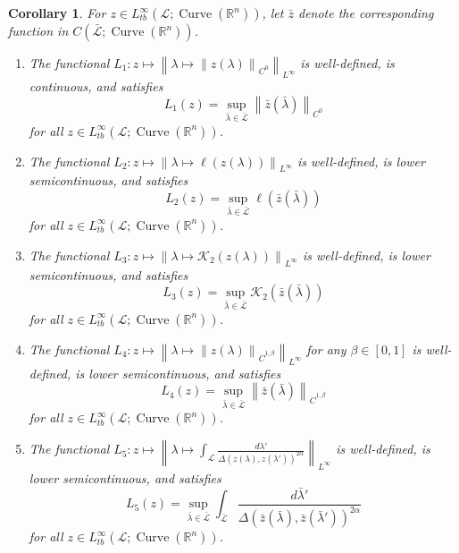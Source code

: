 \documentclass[reqno,centertags,12pt]{amsart}
\newtheorem{corollary}[theorem]{Corollary}
\theoremstyle{definition}
\numberwithin{equation}{section}
\newcommand{\norm}[1]{\left\|#1\right\|}
\newcommand{\bbR}{{\mathbb{R}}}
\begin{document}
\begin{corollary}\label{CC.8}
    For $z\in L_{tb}^{\infty}(\mathcal{L};\operatorname{Curve}(\bbR^{n}))$,
    let $\bar{z}$ denote the corresponding function in
    $C(\bar{\mathcal{L}};\operatorname{Curve}(\bbR^{n}))$.
    \begin{enumerate}
        \item The functional $L_{1}\colon z\mapsto
        \norm{\lambda\mapsto\norm{z(\lambda)}_{C^{0}}}_{L^{\infty}}$
        is well-defined, is continuous, and satisfies
        \[
            L_{1}(z) = \sup_{\bar{\lambda}\in\bar{\mathcal{L}}}
            \norm{\bar{z}(\bar{\lambda})}_{C^{0}}
        \]
        for all $z\in L_{tb}^{\infty}(\mathcal{L};\operatorname{Curve}(\bbR^{n}))$.

        \item The functional $L_{2}\colon z\mapsto
        \norm{\lambda\mapsto\ell(z(\lambda))}_{L^{\infty}}$
        is well-defined, is lower semicontinuous, and satisfies
        \[
            L_{2}(z) = \sup_{\bar{\lambda}\in\bar{\mathcal{L}}}
            \ell(\bar{z}(\bar{\lambda}))
        \]
        for all $z\in L_{tb}^{\infty}(\mathcal{L};\operatorname{Curve}(\bbR^{n}))$.

        \item The functional $L_{3}\colon z\mapsto
        \norm{\lambda\mapsto\mathcal{K}_{2}(z(\lambda))}_{L^{\infty}}$
        is well-defined, is lower semicontinuous, and satisfies
        \[
            L_{3}(z) = \sup_{\bar{\lambda}\in\bar{\mathcal{L}}}
            \mathcal{K}_{2}(\bar{z}(\bar{\lambda}))
        \]
        for all $z\in L_{tb}^{\infty}(\mathcal{L};\operatorname{Curve}(\bbR^{n}))$.

        \item The functional $L_{4}\colon z\mapsto
        \norm{\lambda\mapsto\norm{z(\lambda)}_{\dot{C}^{1,\beta}}}_{L^{\infty}}$
        for any $\beta\in[0,1]$ is well-defined, is lower semicontinuous, and satisfies
        \[
            L_{4}(z) = \sup_{\bar{\lambda}\in\bar{\mathcal{L}}}
            \norm{\bar{z}(\bar{\lambda})}_{\dot{C}^{1,\beta}}
        \]
        for all $z\in L_{tb}^{\infty}(\mathcal{L};\operatorname{Curve}(\bbR^{n}))$.

        \item The functional $L_{5}\colon z\mapsto
        \norm{\lambda\mapsto\int_{\mathcal{L}}
        \frac{d\lambda'}{\Delta(z(\lambda),z(\lambda'))^{2\alpha}}}_{L^{\infty}}$
        is well-defined, is lower semicontinuous, and satisfies
        \[
            L_{5}(z) = \sup_{\bar{\lambda}\in\bar{\mathcal{L}}}
            \int_{\bar{\mathcal{L}}}\frac{d\bar{\lambda}'}
            {\Delta(\bar{z}(\bar{\lambda}),\bar{z}(\bar{\lambda}'))^{2\alpha}}
        \]
        for all $z\in L_{tb}^{\infty}(\mathcal{L};\operatorname{Curve}(\bbR^{n}))$.
    \end{enumerate}
\end{corollary}
\end{document}
